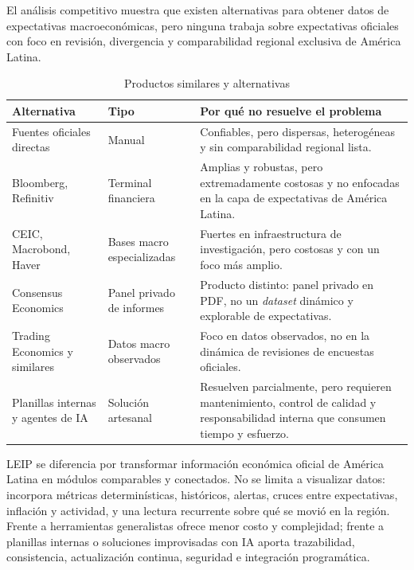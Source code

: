 \documentclass[11pt,a4paper]{article}
\newcommand{\proyectoNombre}{LEIP}
\begin{document}
El an\'alisis competitivo muestra que existen alternativas para obtener datos de
expectativas macroecon\'omicas, pero ninguna trabaja sobre expectativas
oficiales con foco en revisi\'on, divergencia y comparabilidad regional
exclusiva de Am\'erica Latina.

\begin{table}[htbp]
\centering
\caption{Productos similares y alternativas}
\label{tab:competencia}
\begin{tabularx}{\textwidth}{l l X}
\toprule
\textbf{Alternativa} & \textbf{Tipo} & \textbf{Por qu\'e no resuelve el problema} \\
\midrule
Fuentes oficiales directas & Manual &
Confiables, pero dispersas, heterog\'eneas y sin comparabilidad regional lista. \\
\addlinespace
Bloomberg, Refinitiv & Terminal financiera &
Amplias y robustas, pero extremadamente costosas y no enfocadas en la capa de
expectativas de Am\'erica Latina. \\
\addlinespace
CEIC, Macrobond, Haver & Bases macro especializadas &
Fuertes en infraestructura de investigaci\'on, pero costosas y con un foco
m\'as amplio. \\
\addlinespace
Consensus Economics & Panel privado de informes &
Producto distinto: panel privado en PDF, no un \emph{dataset} din\'amico y
explorable de expectativas. \\
\addlinespace
Trading Economics y similares & Datos macro observados &
Foco en datos observados, no en la din\'amica de revisiones de encuestas oficiales. \\
\addlinespace
Planillas internas y agentes de IA & Soluci\'on artesanal &
Resuelven parcialmente, pero requieren mantenimiento, control de calidad y
responsabilidad interna que consumen tiempo y esfuerzo. \\
\bottomrule
\end{tabularx}
\end{table}

\proyectoNombre{} se diferencia por transformar informaci\'on econ\'omica
oficial de Am\'erica Latina en m\'odulos comparables y conectados. No se limita
a visualizar datos: incorpora m\'etricas determin\'isticas, hist\'oricos,
alertas, cruces entre expectativas, inflaci\'on y actividad, y una lectura
recurrente sobre qu\'e se movi\'o en la regi\'on. Frente a herramientas
generalistas ofrece menor costo y complejidad; frente a planillas internas o
soluciones improvisadas con IA aporta trazabilidad, consistencia,
actualizaci\'on continua, seguridad e integraci\'on program\'atica.
\end{document}
